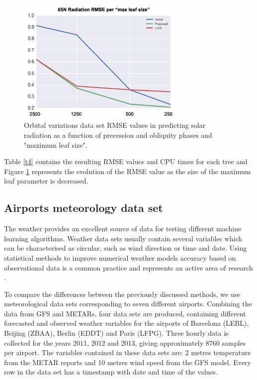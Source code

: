 \documentclass[times,twocolumn,final,authoryear]{elsarticle}
\begin{document}
\begin{figure}
  \includegraphics[width=8cm]{milankovitch_fig.png}
  \caption{Orbital variations data set RMSE values in predicting solar radiation as a function of precession and obliquity phases and "maximum leaf size".}
\label{f_tbn}
\end{figure}

Table \ref{t4} contains the resulting RMSE values and CPU times for each tree and Figure \ref{f_tbn} represents the evolution of the RMSE value as the size of the maximum leaf parameter is decreased.

\subsection{Airports meteorology data set}

The weather provides an excellent source of data for testing different machine learning algorithms. Weather data sets usually contain several variables which can be characterised as circular, such as wind direction or time and date. Using statistical methods to improve numerical weather models accuracy based on observational data is a common practice and represents an active area of research \citep{Larraondoetal2014, Salamehetal2009}.

To compare the differences between the previously discussed methods, we use meteorological data sets corresponding to seven different airports. Combining the data from GFS and METARs, four data sets are produced, containing different forecasted and observed weather variables for the airports of Barcelona (LEBL), Beijing (ZBAA), Berlin (EDDT) and Paris (LFPG). Three hourly data is collected for the years 2011, 2012 and 2013, giving approximately 8760 samples per airport. The variables contained in these data sets are: 2 metres temperature from the METAR reports and 10 metres wind speed from the GFS model. Every row in the data set has a timestamp with date and time of the values. 
\end{document}

